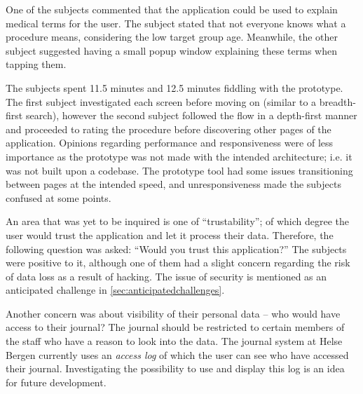 One of the subjects commented that the application could be used to explain medical terms for the user. The subject stated that not everyone knows what a procedure means, considering the low target group age. Meanwhile, the other subject suggested having a small popup window explaining these terms when tapping them.

The subjects spent 11.5 minutes and 12.5 minutes fiddling with the prototype. The first subject investigated each screen before moving on (similar to a breadth-first search), however the second subject followed the flow in a depth-first manner and proceeded to rating the procedure before discovering other pages of the application. Opinions regarding performance and responsiveness were of less importance as the prototype was not made with the intended architecture; i.e. it was not built upon a codebase. The prototype tool had some issues transitioning between pages at the intended speed, and unresponsiveness made the subjects confused at some points.

An area that was yet to be inquired is one of \enquote{trustability}; of which degree the user would trust the application and let it process their data. Therefore, the following question was asked: \enquote{Would you trust this application?} The subjects were positive to it, although one of them had a slight concern regarding the risk of data loss as a result of hacking. The issue of security is mentioned as an anticipated challenge in \autoref{sec:anticipatedchallenges}. 

Another concern was about visibility of their personal data -- who would have access to their journal? The journal should be restricted to certain members of the staff who have a reason to look into the data. The journal system at Helse Bergen currently uses an \emph{access log} of which the user can see who have accessed their journal. Investigating the possibility to use and display this log is an idea for future development.
